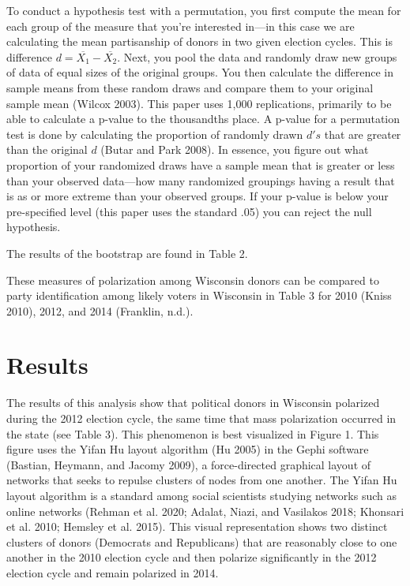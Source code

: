 \documentclass[12pt,]{article}
\begin{document}
To conduct a hypothesis test with a permutation, you first compute the
mean for each group of the measure that you're interested in---in this
case we are calculating the mean partisanship of donors in two given
election cycles. This is difference
\(d = \overline{X_{1}}-\overline{X_{2}}\). Next, you pool the data and
randomly draw new groups of data of equal sizes of the original groups.
You then calculate the difference in sample means from these random
draws and compare them to your original sample mean (Wilcox 2003). This
paper uses 1,000 replications, primarily to be able to calculate a
p-value to the thousandths place. A p-value for a permutation test is
done by calculating the proportion of randomly drawn \(d's\) that are
greater than the original \(d\) (Butar and Park 2008). In essence, you
figure out what proportion of your randomized draws have a sample mean
that is greater or less than your observed data---how many randomized
groupings having a result that is as or more extreme than your observed
groups. If your p-value is below your pre-specified level (this paper
uses the standard .05) you can reject the null hypothesis.

The results of the bootstrap are found in Table 2.

These measures of polarization among Wisconsin donors can be compared to
party identification among likely voters in Wisconsin in Table 3 for
2010 (Kniss 2010), 2012, and 2014 (Franklin, n.d.).

\hypertarget{results}{%
\section{Results}\label{results}}

The results of this analysis show that political donors in Wisconsin
polarized during the 2012 election cycle, the same time that mass
polarization occurred in the state (see Table 3). This phenomenon is
best visualized in Figure 1. This figure uses the Yifan Hu layout
algorithm (Hu 2005) in the Gephi software (Bastian, Heymann, and Jacomy
2009), a force-directed graphical layout of networks that seeks to
repulse clusters of nodes from one another. The Yifan Hu layout
algorithm is a standard among social scientists studying networks such
as online networks (Rehman et al. 2020; Adalat, Niazi, and Vasilakos
2018; Khonsari et al. 2010; Hemsley et al. 2015). This visual
representation shows two distinct clusters of donors (Democrats and
Republicans) that are reasonably close to one another in the 2010
election cycle and then polarize significantly in the 2012 election
cycle and remain polarized in 2014.
\end{document}
